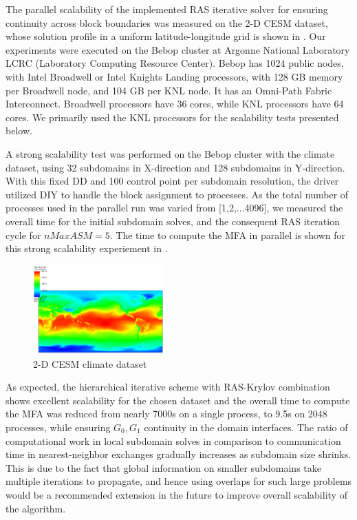 The parallel scalability of the implemented RAS iterative solver for ensuring continuity across block boundaries was measured on the 2-D CESM dataset, whose solution profile in a uniform latitude-longitude grid is shown in . 
Our experiments were executed on the Bebop cluster at
Argonne National Laboratory LCRC (Laboratory Computing Resource Center). Bebop has 1024 public nodes, with Intel Broadwell or Intel Knights Landing processors, with 128 GB memory per Broadwell node, and 104 GB per KNL node. It has an Omni-Path Fabric Interconnect. Broadwell processors have 36 cores, while KNL processors have 64 cores. We primarily used the KNL processors for the scalability tests presented below.

A strong scalability test was performed on the Bebop cluster with the climate dataset, using 32 subdomains in X-direction and 128 subdomains in Y-direction. With this fixed DD and 100 control point per subdomain resolution, the driver utilized DIY to handle the block assignment to processes. As the total number of processes used in the parallel run was varied from [1,2,$\ldots$4096], we measured the overall time for the initial subdomain solves, and the consequent RAS iteration cycle for $nMaxASM=5$. The time to compute the MFA in parallel is shown for this strong scalability experiement in .

\begin{figure}
	\includegraphics[width=0.45\textwidth]{figures/cesm-profile.png}
	\caption{2-D CESM climate dataset}
	\label{fig:cesm-2d-profile]}
\end{figure}

As expected, the hierarchical iterative scheme with RAS-Krylov combination shows excellent scalability for the chosen dataset and the overall time to compute the MFA was reduced from nearly 7000s on a single process,  to 9.5s on 2048 processes, while ensuring $G_0, G_1$ continuity in the domain interfaces. The ratio of computational work in local subdomain solves in comparison to communication time in nearest-neighbor exchanges gradually increases as subdomain size shrinks. This is due to the fact that global information on smaller subdomains take multiple iterations to propagate, and hence using overlaps for such large problems would be a recommended extension in the future to improve overall scalability of the algorithm.

